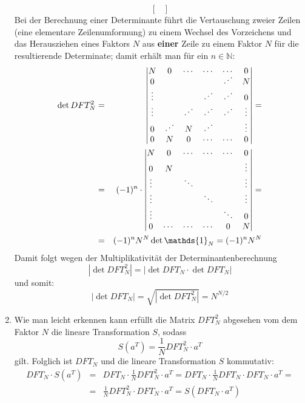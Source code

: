 \begin{enumerate}[1.]
\[\begin{bmatrix}
	\end{bmatrix} \]
	Bei der Berechnung einer Determinante führt die Vertauschung zweier Zeilen
	(eine elementare Zeilenumformung) zu einem Wechsel des Vorzeichens und das
	Herausziehen eines Faktors $N$ aus {\bf einer} Zeile zu einem Faktor $N$ für die
	resultierende Determinate; damit erhält man für ein $n \in \mathbb{N}$:
	\begin{eqnarray*}
	\det DFT_N^2 &=& \begin{vmatrix}
		N      & 0      & \cdots & \cdots & \cdots & 0      \\
		0      &        &        &        & \Ddots & N      \\
		\vdots &        &        & \Ddots & \Ddots & 0      \\
		\vdots &        & \Ddots & \Ddots & \Ddots & \vdots \\
		0      & \Ddots & N      & \Ddots &        & \vdots \\
		0      & N      & 0      & \cdots & \cdots & 0      \\
	\end{vmatrix} = \\
	& = & (-1)^n \cdot \begin{vmatrix}
		N      & 0      & \cdots & \cdots & \cdots & 0      \\
		0      & N      &        &        &        & \vdots \\
		\vdots &       & \ddots &        &        & \vdots \\
		\vdots &        &        & \ddots &        & \vdots \\
		\vdots &        &        &        & \ddots & 0      \\
		0      & \cdots & \cdots & \cdots & 0      & N      \\
	\end{vmatrix} = \\
	&=& (-1)^n N^N \det \mathds{1}_N = (-1)^n N^N \\
	\end{eqnarray*}
	Damit folgt wegen der Multiplikativität der Determinantenberechnung
	\[ | \det DFT_N^2 | = |\det DFT_N \cdot \det DFT_N| \]
	und somit:
	\[ | \det DFT_N | = \sqrt{|\det DFT_N^2|} = N^{N/2} \]

	\item Wie man leicht erkennen kann erfüllt die Matrix $DFT_N^2$ abgesehen vom dem
	Faktor $N$ die lineare Transformation $S$, sodass
	\[ S(a^T) = \frac{1}{N} DFT_N^2 \cdot a^T \]
	gilt.
	Folglich ist $DFT_N$ und die lineare Transformation $S$ kommutativ:
	\begin{eqnarray*}
	DFT_N \cdot S(a^T) &=& DFT_N \cdot \frac{1}{N}DFT_N^2 \cdot a^T = DFT_N \cdot \frac{1}{N} DFT_N \cdot DFT_N \cdot a^T = \\
	&=& \frac{1}{N}DFT_N^2 \cdot DFT_N \cdot a^T = S(DFT_N \cdot a^T)
	\end{eqnarray*}


\end{enumerate}
